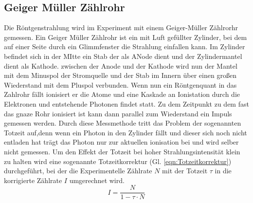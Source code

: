 \subsection{Geiger Müller Zählrohr}
Die Röntgenstrahlung wird im Experiment mit einem Geiger-Müller Zählrorhr gemessen.
Ein Geiger Müller Zählrohr ist ein mit Luft gefüllter Zylinder, bei dem auf einer Seite durch ein Glimmfenster die Strahlung einfallen kann.
Im Zylinder befindet sich in der MItte ein Stab der als ANode dient und der Zylindermantel dient als Kathode.
zwischen der Anode und der Kathode wird nun der Mantel mit dem Minuspol der Stromquelle und der Stab im Innern über einen großen Wiederstand mit dem Pluspol verbunden.
Wenn nun ein Röntgenquant in das Zahlrohr fällt ionisiert er die Atome und eine Kaskade an Ionistation durch die Elektronen und entstehende Photonen findet statt.
Zu dem Zeitpunkt zu dem fast das gnaze Rohr ionisiert ist kann dann parallel zum Wiederstand ein Impuls gemessen werden.
Durch diese Messmethode tritt das Problem der sogenannten Totzeit auf,denn wenn ein Photon in den Zylinder fällt und dieser sich noch nicht entladen hat trägt das Photon nur zur aktuellen ionisation bei und wird selber nicht gemessen.
Um den Effekt der Totzeit bei hoher Strahlungsintensität klein zu halten wird eine sogenannte Totzeitkorrektur (Gl. \ref{eqn:Totzeitkorrektur}) durchgeführt, bei der die Experimentelle Zählrate $N$ mit der Totzeit $\tau$ in die korrigierte Zählrate $I$ umgerechnet wird.
\begin{equation}
    I  = \frac{N}{1-\tau \cdot N}    \label{eqn:Totzeitkorrektur}
\end{equation}

